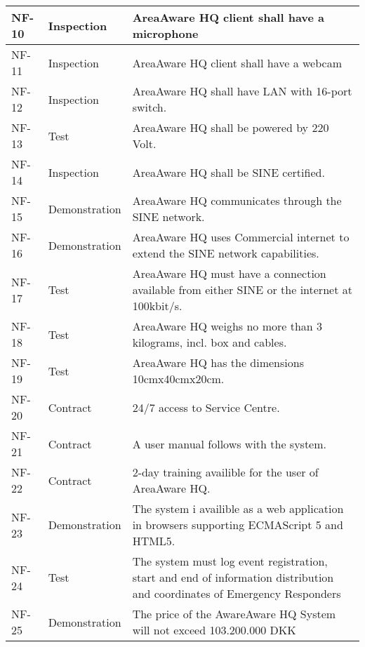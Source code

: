 \begin{longtable}{| p{2.4cm}  | p{2.6cm} | p{6.6cm} |  }
	NF-10	& Inspection	& AreaAware HQ client shall have a microphone \\ \hline
	NF-11	& Inspection	& AreaAware HQ client shall have a webcam \\ \hline
	NF-12	& Inspection	& AreaAware HQ shall have LAN with 16-port switch. \\ \hline
	NF-13	& Test			& AreaAware HQ shall be powered by 220 Volt. \\ \hline
	NF-14	& Inspection	& AreaAware HQ shall be SINE certified. \\ \hline
	NF-15	& Demonstration	& AreaAware HQ communicates through the SINE network. \\ \hline
	NF-16	& Demonstration	& AreaAware HQ uses Commercial internet to extend the SINE network capabilities. \\ \hline
	NF-17	& Test			& AreaAware HQ must have a connection available from either SINE or the internet at 100kbit/s. \\ \hline
	NF-18	& Test			& AreaAware HQ weighs no more than 3 kilograms, incl. box and cables. \\ \hline
	NF-19	& Test			& AreaAware HQ has the dimensions 10cmx40cmx20cm. \\ \hline
	NF-20	& Contract		& 24/7 access to Service Centre. \\ \hline
	NF-21	& Contract		& A user manual follows with the system. \\ \hline
	NF-22	& Contract		& 2-day training availible for the user of AreaAware HQ. \\ \hline
	NF-23	& Demonstration	& The system i availible as a web application in browsers supporting ECMAScript 5 and HTML5. \\ \hline
	NF-24   & Test          & The system must log event registration, start and end of information distribution and coordinates of Emergency Responders \\ \hline
	NF-25	& Demonstration	& The price of the AwareAware HQ System will not exceed 103.200.000 DKK \\ \hline
	
\end{longtable}